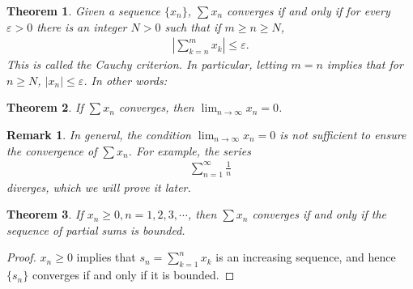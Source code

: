 \documentclass[10pt]{book}
\newtheorem{theorem}{Theorem}[chapter]
\newtheorem{remark}{Remark}[chapter]
\theoremstyle{definition}
\numberwithin{equation}{chapter}
\begin{document}
\medskip

\begin{theorem}
Given a sequence $\{x_n\}$, $\sum x_n$ converges if and only if for every $\varepsilon > 0$ there is an integer $N > 0$ such that if $m \geq n \geq N$,
\begin{align*}
    \left|\sum^m_{k=n} x_k\right| \leq \varepsilon.
\end{align*}
This is called the Cauchy criterion. In particular, letting $m = n$ implies that for $n \geq N$, $\left|x_n\right| \leq \varepsilon$. In other words:
\end{theorem}

\medskip

\begin{theorem}\label{th_218}
If $\sum x_n$ converges, then $\lim_{n\to\infty} x_n = 0$.
\end{theorem}

\medskip

\begin{remark}
In general, the condition $\lim_{n\to\infty} x_n = 0$ is not sufficient to ensure the convergence of $\sum x_n$. For example, the series
\begin{align*}
    \sum^\infty_{n=1} \frac{1}{n}
\end{align*}
diverges, which we will prove it later. 
\end{remark}

\medskip

\begin{theorem}\label{th_219}
If $x_n \geq 0, n = 1,2,3,\cdots$, then $\sum x_n$ converges if and only if the sequence of partial sums is bounded. 
\end{theorem}
\begin{proof}
$x_n \geq 0$ implies that $s_n = \sum^n_{k=1} x_k$ is an increasing sequence, and hence $\{s_n\}$ converges if and only if it is bounded.
\end{proof}

\medskip
\end{document}
